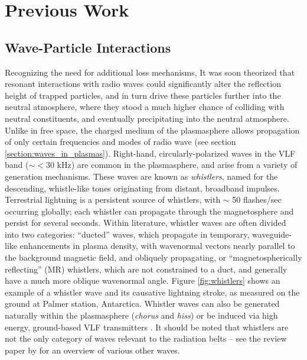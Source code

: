 \section{Previous Work}

\subsection{Wave-Particle Interactions}
Recognizing the need for additional loss mechanisms, It was soon theorized that resonant interactions with radio waves could significantly alter the reflection height of trapped particles, and in turn drive these particles further into the neutral atmosphere, where they stood a much higher chance of colliding with neutral constituents, and eventually precipitating into the neutral atmosphere. Unlike in free space, the charged medium of the plasmasphere allows propagation of only certain frequencies and modes of radio wave (see section \ref{section:waves_in_plasmas}). Right-hand, circularly-polarized waves in the VLF band ($\sim < 30 $ kHz) are common in the plasmasphere, and arise from a variety of generation mechanisms. These waves are known as \emph{whistlers}, named for the descending, whistle-like tones originating from distant, broadband impulses. Terrestrial lightning is a persistent source of whistlers, with $\sim$ 50 flashes/sec occurring globally; each whistler can propagate through the magnetosphere and persist for several seconds. Within literature, whistler waves are often divided into two categories: ``ducted'' waves, which propagate in temporary, waveguide-like enhancements in plasma density, with wavenormal vectors nearly parallel to the background magnetic field, and obliquely propagating, or ``magnetospherically reflecting'' (MR) whistlers, which are not constrained to a duct, and generally have a much more oblique wavenormal angle. Figure \ref{fig:whistlers} shows an example of a whistler wave and its causative lightning stroke, as measured on the ground at Palmer station, Antarctica. 
Whistler waves can also be generated naturally within the plasmasphere (\emph{chorus} and \emph{hiss}) or be induced via high energy, ground-based VLF transmitters \citep{Graf2013}. It should be noted that whistlers are not the only category of waves relevant to the radiation belts -- see the review paper by \cite{Thorne2010a} for an overview of various other waves.

